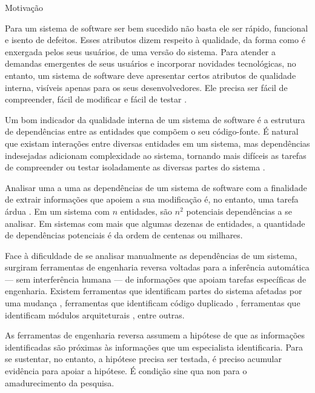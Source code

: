 \begin{section}{Motivação}

		Para um sistema de software ser bem sucedido não basta ele ser rápido, funcional e isento de defeitos. Esses atributos dizem respeito à qualidade, da forma como é enxergada pelos seus usuários, de uma versão do sistema. Para atender a demandas emergentes de seus usuários e incorporar novidades tecnológicas, no entanto, um sistema de software deve apresentar certos atributos de qualidade interna, visíveis apenas para os seus desenvolvedores. Ele precisa ser fácil de compreender, fácil de modificar e fácil de testar \cite{Parnas1994}.

		Um bom indicador da qualidade interna de um sistema de software é a estrutura de dependências entre as entidades que compõem o seu código-fonte. É natural que existam interações entre diversas entidades em um sistema, mas dependências indesejadas adicionam complexidade ao sistema, tornando mais difíceis as tarefas de compreender ou testar isoladamente as diversas partes do sistema \cite{Chidamber1994}. %

		Analisar uma a uma as dependências de um sistema de software com a finalidade de extrair informações que apoiem a sua modificação é, no entanto, uma tarefa árdua \cite{Tonella2007}. Em um sistema com $n$ entidades, são $n^2$ potenciais dependências a se analisar. Em sistemas com mais que algumas dezenas de entidades, a quantidade de dependências potenciais é da ordem de centenas ou milhares. %
		
		Face à dificuldade de se analisar manualmente as dependências de um sistema, surgiram ferramentas de engenharia reversa voltadas para a inferência automática --- sem interferência humana --- de informações que apoiam tarefas específicas de engenharia. Existem ferramentas que identificam partes do sistema afetadas por uma mudança \cite{Arnold1993}, ferramentas que identificam código duplicado \cite{Roy2007}, ferramentas que identificam módulos arquiteturais \cite{Maqbool2007}, entre outras. 

		As ferramentas de engenharia reversa assumem a hipótese de que as informações identificadas são próximas às informações que um especialista identificaria. Para se sustentar, no entanto, a hipótese precisa ser testada, é preciso acumular evidência para apoiar a hipótese. É condição sine qua non para o amadurecimento da pesquisa.


\end{section}
